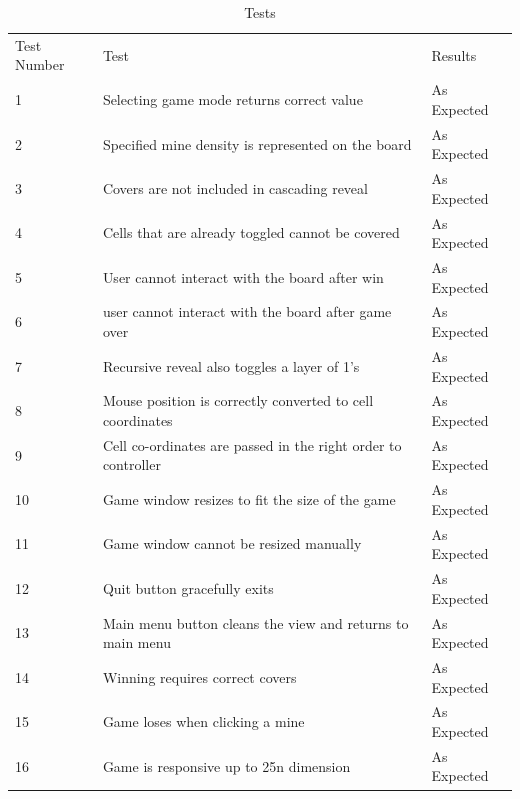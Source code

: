 \documentclass[12pt, a4]{report}
\begin{document}
\begin{table}[!h]
\centering
\caption{Tests}
\label{my-label}
\begin{tabular}{lll}
Test Number & Test                                                          & Results     \\
1           & Selecting game mode returns correct value                     & \textcolor{codegreen}{As Expected} \\
2           & Specified mine density is represented on the board            & \textcolor{codegreen}{As Expected} \\
3           & Covers are not included in cascading reveal                   & \textcolor{codegreen}{As Expected} \\
4           & Cells that are already toggled cannot be covered              & \textcolor{codegreen}{As Expected} \\
5           & User cannot interact with the board after win                 & \textcolor{codegreen}{As Expected} \\
6           & user cannot interact with the board after game over           & \textcolor{codegreen}{As Expected} \\
7           & Recursive reveal also toggles a layer of 1's                  & \textcolor{codegreen}{As Expected} \\
8           & Mouse position is correctly converted to cell coordinates     & \textcolor{codegreen}{As Expected} \\
9           & Cell co-ordinates are passed in the right order to controller & \textcolor{codegreen}{As Expected} \\
10          & Game window resizes to fit the size of the game               & \textcolor{codegreen}{As Expected} \\
11          & Game window cannot be resized manually                        & \textcolor{codegreen}{As Expected} \\
12          & Quit button gracefully exits                                  & \textcolor{codegreen}{As Expected} \\
13          & Main menu button cleans the view and returns to main menu     & \textcolor{codegreen}{As Expected} \\
14          & Winning requires correct covers                               & \textcolor{codegreen}{As Expected} \\
15          & Game loses when clicking a mine                               & \textcolor{codegreen}{As Expected} \\
16          & Game is responsive up to 25n dimension                        & \textcolor{codegreen}{As Expected}
\end{tabular}
\end{table}
\end{document}
